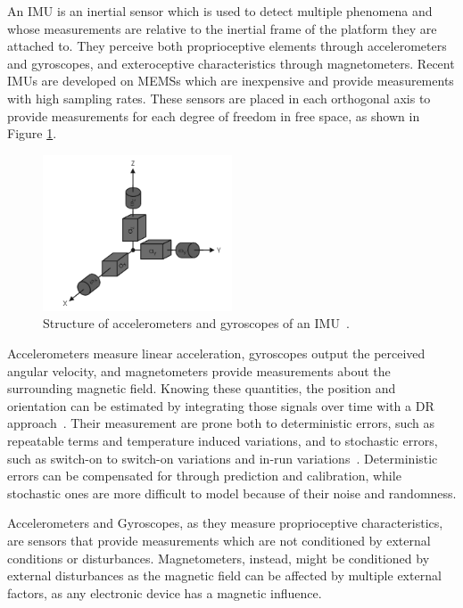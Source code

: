 \noindent An \gls{IMU} is an inertial sensor which is used to detect multiple phenomena and whose measurements are relative to the inertial frame of the platform they are attached to.
They perceive both proprioceptive elements through accelerometers and gyroscopes, and exteroceptive characteristics through magnetometers.
Recent \glspl{IMU} are developed on \glspl{MEMS} which are inexpensive and provide measurements with high sampling rates.
These sensors are placed in each orthogonal axis to provide measurements for each degree of freedom in free space, as shown in Figure \ref{fig:imu}.
\begin{figure}[!ht]
  \begin{center}
    \includegraphics[width=0.5\textwidth]{Images/2-Background/IMU-2021-04-23 14-13-19.png}
  \end{center}
  \caption{Structure of accelerometers and gyroscopes of an \Gls{IMU}~\cite{inertial}.}
  \label{fig:imu}
\end{figure}

Accelerometers measure linear acceleration, gyroscopes output the perceived angular velocity, and magnetometers provide measurements about the surrounding magnetic field.
Knowing these quantities, the position and orientation can be estimated by integrating those signals over time with a \gls{DR} approach~\cite{indr}.
Their measurement are prone both to deterministic errors, such as repeatable terms and temperature induced variations, and to stochastic errors, such as switch-on to switch-on variations and in-run variations~\cite{magnusson_improving_2012}.
Deterministic errors can be compensated for through prediction and calibration, while stochastic ones are more difficult to model because of their noise and randomness.

Accelerometers and Gyroscopes, as they measure proprioceptive characteristics, are sensors that provide measurements which are not conditioned by external conditions or disturbances.
Magnetometers, instead, might be conditioned by external disturbances as the magnetic field can be affected by multiple external factors, as any electronic device has a magnetic influence.


